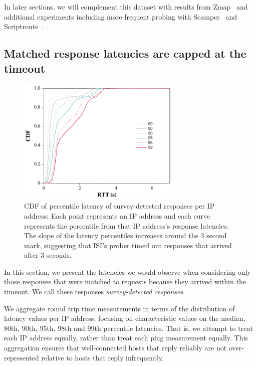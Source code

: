 In later sections, we will complement this dataset with
results from Zmap~\cite{durumeric2013zmap} and additional experiments
including more frequent probing with Scamper~\cite{luckie2010scamper} and
Scriptroute~\cite{usits03-spring}.

\subsection{Matched response latencies are capped at the timeout}

\begin{figure}[t]
\begin{center}
\includegraphics[width=0.7\textwidth]{timeouts/figs/cdf_raw_ping_ttl}
\end{center}
\caption[Survey-detected response latencies are capped at the timeout]{\label{fig:raw_lat}%
CDF of percentile latency of survey-detected responses per IP address: Each point represents an IP address
and each curve represents the percentile from that IP address's
response latencies. The slope of the latency
percentiles increases around the 3 second mark, suggesting that
ISI's prober timed out responses that arrived after 3 seconds.
}
\end{figure}

In this section, we present the latencies we would observe
when considering only those responses that were matched to 
requests because they arrived within the timeout.  We call 
these responses \emph{survey-detected responses}.

We aggregate round trip time measurements in terms of the
distribution of latency values per IP address, focusing on
characteristic values on the median, 80th, 90th, 95th, 98th
and 99th percentile latencies.  That is, we attempt to treat
each IP address equally, rather than treat each ping
measurement equally.  This aggregation ensures that
well-connected hosts that reply reliably are not
over-represented relative to hosts that reply infrequently.

